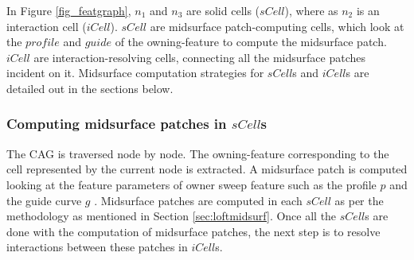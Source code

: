 In Figure \ref{fig_featgraph},  $n_1$ and $n_3$ are solid cells ($sCell$), where as $n_2$ is an interaction cell ($iCell$).  $sCell$ are midsurface patch-computing cells, which look at the $profile$ and $guide$ of the owning-feature to compute the midsurface patch. $iCell$ are interaction-resolving cells, connecting all the midsurface patches incident on it. Midsurface computation strategies for $sCell$s and  $iCell$s are detailed out in the sections below.
			
\subsubsection{Computing midsurface patches in $sCell$s}
\label{sec:scell}
The CAG is traversed node by node. The owning-feature corresponding to the cell represented by the current node is extracted. A midsurface patch is computed looking at the feature parameters of owner sweep feature such as the profile $p$ and the guide curve $g$ .%
Midsurface patches are computed in each $sCell$ as per the methodology as mentioned in Section \ref{sec:loftmidsurf}. Once all the $sCell$s are done with the computation of midsurface patches, the next step is to resolve interactions  between these patches in $iCell$s.





